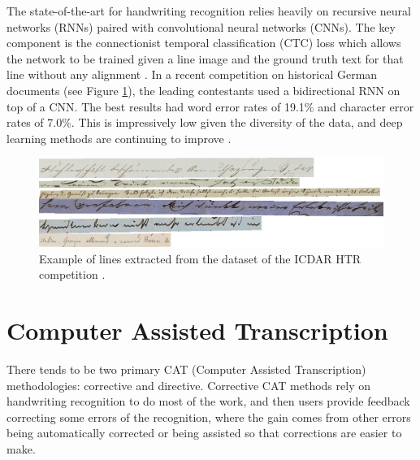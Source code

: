 \documentclass[ms,electronic,twosidetoc,letterpaper,chaptercenter,parttop,lof,lot]{byumsphd}
\begin{document}
The state-of-the-art for handwriting recognition relies heavily on recursive neural networks (RNNs) paired with convolutional neural networks (CNNs). The key component is the connectionist temporal classification (CTC) loss which allows the network to be trained given a line image and the ground truth text for that line without any alignment \cite{CTC}. In a recent competition on historical German documents \cite{icdarComp2017} (see Figure \ref{fig:germanlines}), the leading contestants used a bidirectional RNN on top of a CNN. The best results had word error rates of 19.1\% and character error rates of 7.0\%. This is impressively low given the diversity of the data, and deep learning methods are continuing to improve \cite{wigington2017,puigcerver2017}.

\begin{figure}[t]
    \centering
    \includegraphics[width=.98\textwidth]{german_lines}
    \caption{Example of lines extracted from the dataset of the ICDAR HTR competition \cite{icdarComp2017}.}
    \label{fig:germanlines}
\end{figure}


\section{Computer Assisted Transcription} 

There tends to be two primary CAT (Computer Assisted Transcription) methodologies: corrective and directive. Corrective CAT methods rely on handwriting recognition to do most of the work, and then users provide feedback correcting some errors of the recognition, where the gain comes from other errors being automatically corrected or being assisted so that corrections are easier to make.
\end{document}
